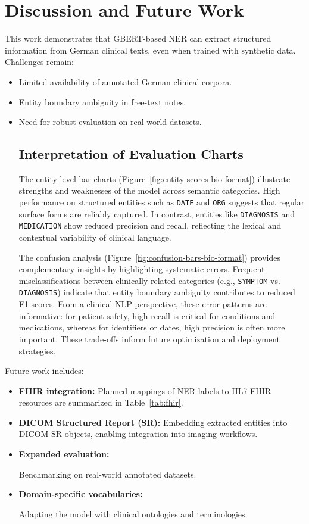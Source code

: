 \documentclass[conference]{IEEEtran}
\begin{document}
\section{Discussion and Future Work}
This work demonstrates that GBERT-based NER can extract structured information from German clinical texts, even when trained with synthetic data. Challenges remain:
\begin{itemize}
    \item Limited availability of annotated German clinical corpora.
    \item Entity boundary ambiguity in free-text notes.
    \item Need for robust evaluation on real-world datasets.
    \subsection{Interpretation of Evaluation Charts}
The entity-level bar charts (Figure~\ref{fig:entity-scores-bio-format}) illustrate strengths and weaknesses of the model across semantic categories. High performance on structured entities such as \texttt{DATE} and \texttt{ORG} suggests that regular surface forms are reliably captured. In contrast, entities like \texttt{DIAGNOSIS} and \texttt{MEDICATION} show reduced precision and recall, reflecting the lexical and contextual variability of clinical language. 

{\raggedright The confusion analysis (Figure~\ref{fig:confusion-bars-bio-format}) provides complementary insights by highlighting systematic errors. Frequent misclassifications between clinically related categories (e.g., \texttt{SYMPTOM} vs. \texttt{DIAGNOSIS}) indicate that entity boundary ambiguity contributes to reduced F1-scores. From a clinical NLP perspective, these error patterns are informative: for patient safety, high recall is critical for conditions and medications, whereas for identifiers or dates, high precision is often more important. These trade-offs inform future optimization and deployment strategies.\par}

\end{itemize}

Future work includes:
\begin{itemize}
    \item \textbf{FHIR integration:} Planned mappings of NER labels to HL7 FHIR resources are summarized in Table~\ref{tab:fhir}.
    \item \textbf{DICOM Structured Report (SR):} Embedding extracted entities into DICOM SR objects, enabling integration into imaging workflows.
    \item \textbf{Expanded evaluation:} {\raggedright Benchmarking on real-world annotated datasets.\par}
    \item \textbf{Domain-specific vocabularies:} {\raggedright Adapting the model with clinical ontologies and terminologies.\par}
\end{itemize}
\end{document}
